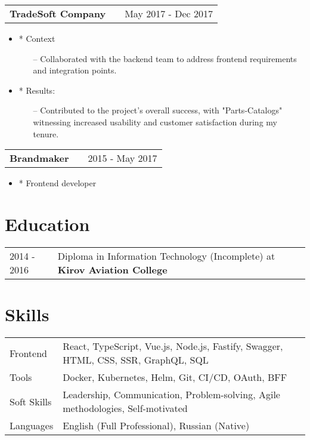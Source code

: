 \documentclass[a4paper,12pt]{article}
\makeatletter
\newenvironment{joblong}[2]
    {
    \begin{tabularx}{\linewidth}{@{}l X r@{}}
    \textbf{#1} & \hfill &  #2 \\[3.75pt]
    \end{tabularx}
    \begin{minipage}[t]{\linewidth}
    \begin{itemize}[nosep,after=\strut, leftmargin=1em, itemsep=3pt,label=--]
    }
    {
    \end{itemize}
    \end{minipage}    
    }
\makeatother
\begin{document}
\begin{joblong}{TradeSoft Company}{May 2017 - Dec 2017}
  \item[*] Context
    \begin{itemize}
      \item [--] Collaborated with the backend team to address frontend requirements and integration points.
    \end{itemize}
  \item [*] Results:
    \begin{itemize}
      \item [--] Contributed to the project's overall success, with "Parts-Catalogs" witnessing increased usability and customer satisfaction during my tenure.
    \end{itemize}
\end{joblong}

\begin{joblong}{Brandmaker}{2015 - May 2017}
\item [*] Frontend developer
\end{joblong}

\section{Education}
\begin{tabularx}{\linewidth}{@{}l X@{}}	
2014 - 2016 & Diploma in Information Technology (Incomplete) at \textbf{Kirov Aviation College} \hfill \normalsize  \\
\end{tabularx}

\section{Skills}
\begin{tabularx}{\linewidth}{@{}l X@{}}
Frontend &  \normalsize{React, TypeScript, Vue.js, Node.js, Fastify, Swagger, HTML, CSS, SSR, GraphQL, SQL}\\
Tools  &  \normalsize{Docker, Kubernetes, Helm, Git, CI/CD, OAuth, BFF}\\  
Soft Skills  &  \normalsize{Leadership, Communication, Problem-solving, Agile methodologies, Self-motivated}\\  
Languages & \normalsize{English (Full Professional), Russian (Native)}\\  
\end{tabularx}

\vfill
{}
\end{document}
